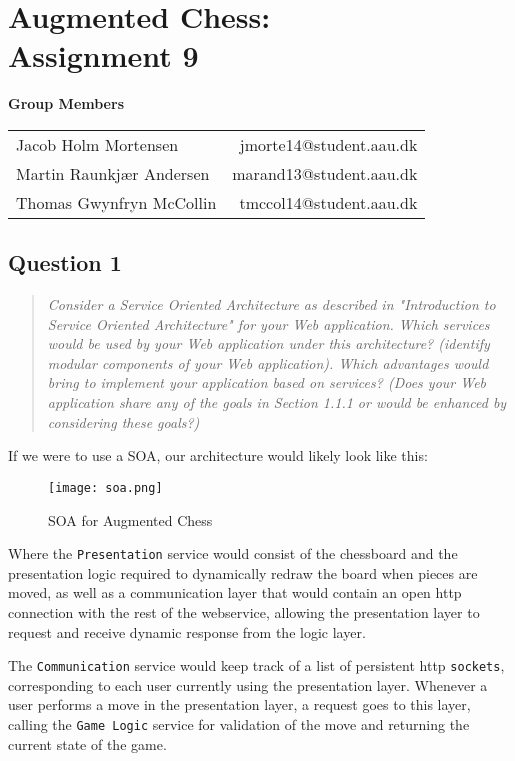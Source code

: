 \documentclass[10pt,a4paper]{report}
\begin{document}
\chapter{Augmented Chess:\\ Assignment 9}

\begin{center}
{\Large \textbf{Group Members}}

\begin{tabular}{l r}
Jacob Holm Mortensen            &       jmorte14@student.aau.dk\\
Martin Raunkjær Andersen        &       marand13@student.aau.dk\\
Thomas Gwynfryn McCollin        &       tmccol14@student.aau.dk
\end{tabular}
\end{center}

\section{Question 1}
\begin{quote}
\textit{Consider a Service Oriented Architecture as described in "Introduction to Service Oriented Architecture" for your Web application. Which services would be used by your Web application under this architecture? (identify modular components of your Web application). Which advantages would bring to implement your application based on services? (Does your Web application share any of the goals in Section 1.1.1 or would be enhanced by considering these goals?)}
\end{quote}

If we were to use a SOA, our architecture would likely look like this:

\begin{figure}[h]
  \centering
  \texttt{[image: soa.png]}
  \caption{SOA for Augmented Chess}
  \label{fig:boat1}
\end{figure}

Where the \texttt{Presentation} service would consist of the chessboard and the presentation logic required to dynamically redraw the board when pieces are moved, as well as a communication layer that would contain an open http connection with the rest of the webservice, allowing the presentation layer to request and receive dynamic response from the logic layer.

The \texttt{Communication} service would keep track of a list of persistent http \texttt{sockets}, corresponding to each user currently using the presentation layer. Whenever a user performs a move in the presentation layer, a request goes to this layer, calling the \texttt{Game Logic} service for validation of the move and returning the current state of the game.
\end{document}
